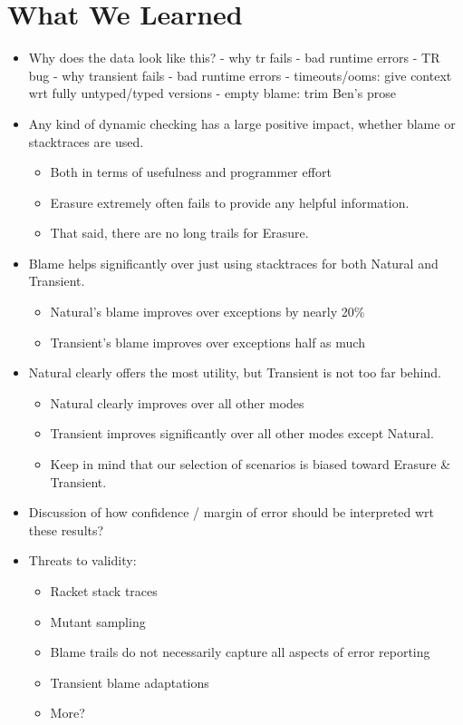 \section{What We Learned}

\begin{itemize}
\item Why does the data look like this?
  - why tr fails
    - bad runtime errors
    - TR bug
  - why transient fails
    - bad runtime errors
    - timeouts/ooms: give context wrt fully untyped/typed versions
    - empty blame: trim Ben's prose

  \item Any kind of dynamic checking has a large positive impact, whether blame or stacktraces are used.
    \begin{itemize}
    \item Both in terms of usefulness and programmer effort
    \item Erasure extremely often fails to provide any helpful information.
    \item That said, there are no long trails for Erasure.
    \end{itemize}

  \item Blame helps significantly over just using stacktraces for both Natural and Transient.
    \begin{itemize}
    \item Natural's blame improves over exceptions by nearly 20\%
    \item Transient's blame improves over exceptions half as much
    \end{itemize}

  \item Natural clearly offers the most utility, but Transient is not too far behind.
    \begin{itemize}
    \item Natural clearly improves over all other modes
    \item Transient improves significantly over all other modes except Natural.
    \item Keep in mind that our selection of scenarios is biased toward Erasure & Transient.
    \end{itemize}
    

  \item Discussion of how confidence / margin of error should be interpreted wrt these results?


   \item Threats to validity:
        \begin{itemize}
          \item Racket stack traces
          \item Mutant sampling
          \item Blame trails do not necessarily capture all aspects of error reporting
          \item Transient blame adaptations
          \item More?

   \end{itemize}
\end{itemize}        

